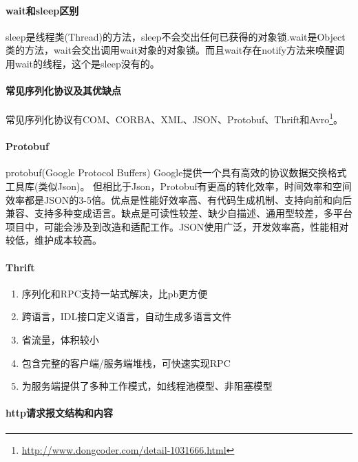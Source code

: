 \documentclass[../../../interview-questions.tex]{subfiles}
\begin{document}
\paragraph{wait和sleep区别}

sleep是线程类(Thread)的方法，sleep不会交出任何已获得的对象锁.wait是Object类的方法，wait会交出调用wait对象的对象锁。而且wait存在notify方法来唤醒调用wait的线程，这个是sleep没有的。








\paragraph{常见序列化协议及其优缺点}

常见序列化协议有COM、CORBA、XML、JSON、Protobuf、Thrift和Avro\footnote{\url{http://www.dongcoder.com/detail-1031666.html}}。

\paragraph{Protobuf}protobuf(Google Protocol Buffers)
Google提供一个具有高效的协议数据交换格式工具库(类似Json)。
但相比于Json，Protobuf有更高的转化效率，时间效率和空间效率都是JSON的3-5倍。优点是性能好效率高、有代码生成机制、支持向前和向后兼容、支持多种变成语言。缺点是可读性较差、缺少自描述、通用型较差，多平台项目中，可能会涉及到改造和适配工作。JSON使用广泛，开发效率高，性能相对较低，维护成本较高。

\paragraph{Thrift}

\begin{enumerate}
\item {序列化和RPC支持一站式解决，比pb更方便}
\item{跨语言，IDL接口定义语言，自动生成多语言文件}
\item{省流量，体积较小}
\item{包含完整的客户端/服务端堆栈，可快速实现RPC}
\item{为服务端提供了多种工作模式，如线程池模型、非阻塞模型}
\end{enumerate}


\paragraph{http请求报文结构和内容}
\end{document}
